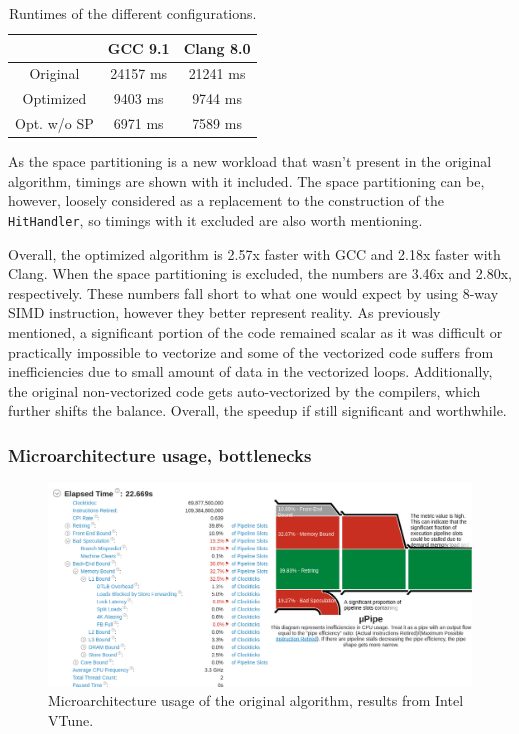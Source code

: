 \documentclass[12pt]{article}
\newcommand{\code}[1]{\texttt{#1}}
\begin{document}
\begin{table}[H]
	\centering
	\begin{tabular}{c | c | c}
		& GCC 9.1 & Clang 8.0 \\
		\hline
		Original & 24157 ms & 21241 ms \\
		\hline
		Optimized & 9403 ms & 9744 ms \\
		\hline
		Opt. w/o SP & 6971 ms & 7589 ms
	\end{tabular}
	\caption{Runtimes of the different configurations.}
	\label{tbl_runtimes_local}
\end{table}
	
As the space partitioning is a new workload that wasn't present in the original algorithm, timings are shown with it included. The space partitioning can be, however, loosely considered as a replacement to the construction of the \code{HitHandler}, so timings with it excluded are also worth mentioning.

Overall, the optimized algorithm is 2.57x faster with GCC and 2.18x faster with Clang. When the space partitioning is excluded, the numbers are 3.46x and 2.80x, respectively. These numbers fall short to what one would expect by using 8-way SIMD instruction, however they better represent reality. As previously mentioned, a significant portion of the code remained scalar as it was difficult or practically impossible to vectorize and some of the vectorized code suffers from inefficiencies due to small amount of data in the vectorized loops. Additionally, the original non-vectorized code gets auto-vectorized by the compilers, which further shifts the balance. Overall, the speedup if still significant and worthwhile.


\subsubsection{Microarchitecture usage, bottlenecks}

\begin{figure}[H]
	\begin{center}
		\includegraphics[width=\textwidth]{velout_uarch_overall_orig}
	\end{center}
	\caption{Microarchitecture usage of the original algorithm, results from Intel VTune.}
	\label{fig_velout_uarch_overall_orig}
\end{figure}
\end{document}
